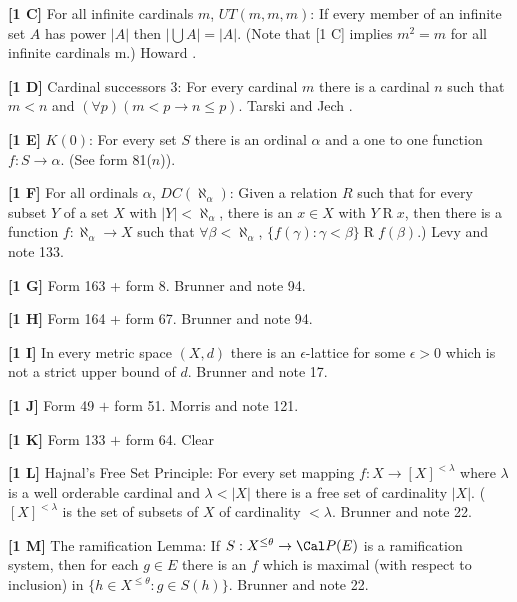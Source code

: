 \smallskip
\item{}{\bf [1 C]} For all infinite cardinals $m$, $UT(m,m,m)$:
If every member of an infinite set $A$ has power $|A|$ then
$|\bigcup A| = |A|$. (Note that [1 C] implies $m^{2} =m$ for
all infinite cardinals m.)  \ac{Howard} \cite{1994}.
\smallskip
\item{}{\bf [1 D]} Cardinal successors 3: For every cardinal $m$ there is
a cardinal $n$ such that $m < n$ and $(\forall p)( m < p \rightarrow
n \le  p )$.  \ac{Tarski} \cite{1954a} and \ac{Jech} \cite{1966a}.
\smallskip
\item{}{\bf [1 E]}  $K(0)$:  For every
set $S$ there is an ordinal $\alpha$ and a one to one function
$f: S \rightarrow \alpha$. (See form 81($n$)).
\smallskip
\item{}{\bf [1 F]} For all ordinals $\alpha$, $DC(\aleph_{\alpha})$:
Given a relation $R$ such that for every subset $Y$ of a set $X$ with
$|Y| < \aleph_{\alpha}$, there is an $x \in X $ with $Y\mathrel R x$,
then there is a function $f:\aleph_{\alpha} \to X$ such that
$\forall\beta < \aleph_{\alpha}$, $\{f(\gamma):\gamma < \beta\}\mathrel R
f(\beta)$.)  \ac{Levy} \cite{1964} and note 133.
\smallskip
\item{}{\bf [1 G]}  Form 163 + form 8. \ac{Brunner} \cite{1982a} and
note 94.
\smallskip
\item{}{\bf [1 H]} Form 164 + form 67. \ac{Brunner} \cite{1982a} and
note 94.
\smallskip
\item{}{\bf [1 I]} In every metric space $(X,d)$ there is an
$\epsilon$-lattice for some $\epsilon >0$ which is not a strict upper
bound of $d$.  \ac{Brunner} \cite{1984e} and note 17.
\smallskip
\item{}{\bf [1 J]}  Form 49 $+$ form 51.  \ac{Morris} \cite{1969} and
note 121.
\smallskip
\item{}{\bf [1 K]}  Form 133 $+$ form 64.  Clear
\smallskip
\item{}{\bf [1 L]}  Hajnal's Free Set Principle:  For every set mapping
$f: X\rightarrow [X]^{<\lambda}$ where $\lambda$ is a well orderable
cardinal and $\lambda< |X|$ there is a free set of cardinality $|X|$.
($[X]^{<\lambda}$ is the set of subsets of $X$ of cardinality $<\lambda$.
\ac{Brunner} \cite{1989} and note 22. 
\smallskip
\item{}{\bf [1 M]}  The ramification Lemma: If $S: X^{\le\theta}
\rightarrow {\Cal P}(E)$ is a ramification system, then for each $g\in E$
there is an $f$ which is maximal (with respect to inclusion) in $\{h\in
X^{\le\theta}: g\in S(h)\}$. \ac{Brunner} \cite{1989} and note 22.

